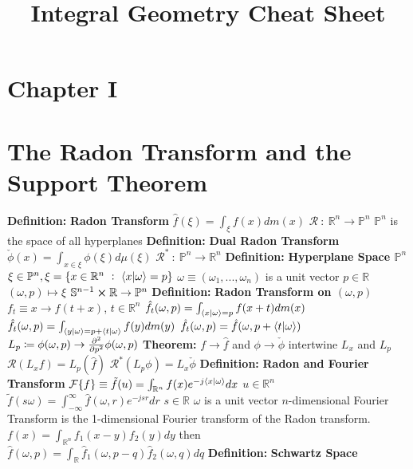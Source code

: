\documentclass[14pt]{extarticle}
\title{Integral Geometry Cheat Sheet}
\def\Definition{{\color{blue} \textbf{Definition:} }}
\def\Theorem{{\color{red} \textbf{Theorem:} }}
\begin{document}
	\maketitle	
	\begin{outline}	
		\section*{Chapter I}
		\section*{The Radon Transform and the Support Theorem}
		\1	\Definition \textbf{Radon Transform}
			\2	$\hat{f}(\xi) = \int_{\xi}f(x) dm(x)$
				\3	$\mathcal{R}~:~\mathbb{R}^n \rightarrow \mathbb{P}^n$
					\4	$\mathbb{P}^n$ is the space of all hyperplanes 
		\1	\Definition \textbf{Dual Radon Transform}
			\2	$\check{\phi}(x) = \int_{x \in \xi} \phi(\xi)d\mu(\xi)$
				\3	$\mathcal{R}^*~:~\mathbb{P}^n \rightarrow \mathbb{R}^n$
		\1	\Definition \textbf{Hyperplane Space $\mathbb{P}^n$}
			\2	$\xi \in \mathbb{P}^n, \xi = \{x \in \mathbb{R}^n~:~\braket{x}{\omega} = p\}$
				\3	$\omega \equiv (\omega_1,...,\omega_n)$ is a unit vector
				\3	$p \in \mathbb{R}$
			\2	$(\omega,p) \mapsto \xi$
			\2	$\mathbb{S}^{n-1} \cross \mathbb{R} \rightarrow \mathbb{P}^n$
		\1	\Definition \textbf{Radon Transform on $(\omega,p)$}
			\2	$f_t \equiv x \rightarrow f(t + x)$, $t \in \mathbb{R}^n$ 
			\2	$\hat{f}_t(\omega,p) = \int_{\braket{x}{\omega} = p}f(x + t)dm(x)$
			\2	$\hat{f}_t(\omega,p) = \int_{\braket{y}{\omega} = p + \braket{t}{\omega}}f(y)dm(y)$
			\2	$\hat{f}_t(\omega,p) = \hat{f}(\omega,p + \braket{t}{\omega})$
			\2	$L_p \coloneqq \phi(\omega,p) \rightarrow \pd[2]{}{p} \phi(\omega,p)$
		\1	\Theorem $f \rightarrow \hat{f}$ and $\phi \rightarrow \check{\phi}$ 
				intertwine $L_x$ and $L_p$
			\2	$\mathcal{R}(L_xf) = L_p(\hat{f})$
			\2	$\mathcal{R}^*(L_p \phi) = L_x \check{\phi}$
		\1	\Definition \textbf{Radon and Fourier Transform}
			\2	$\mathcal{F}\{f\} \equiv \tilde{f}(u) = \int_{\mathbb{R}^n} f(x) e^{-j \braket{x}{\omega}} dx$
				\3	$u \in \mathbb{R}^n$
			\2	$\tilde{f}(s\omega) = \int_{-\infty}^{\infty} \hat{f}(\omega,r)e^{-jsr}dr$
				\3	$s \in \mathbb{R}$
				\3	$\omega$ is a unit vector
			\2	$n$-dimensional Fourier Transform is the 1-dimensional Fourier transform
					of the Radon transform.
			\2	$f(x) = \int_{\mathbb{R}^n} f_1(x-y)f_2(y) dy$ then~\\
					$\hat{f}(\omega,p) = \int_{\mathbb{R}}\hat{f}_1(\omega,p-q)\hat{f}_2(\omega,q)dq$
		\1	\Definition \textbf{Schwartz Space}

\end{outline}
\end{document}
